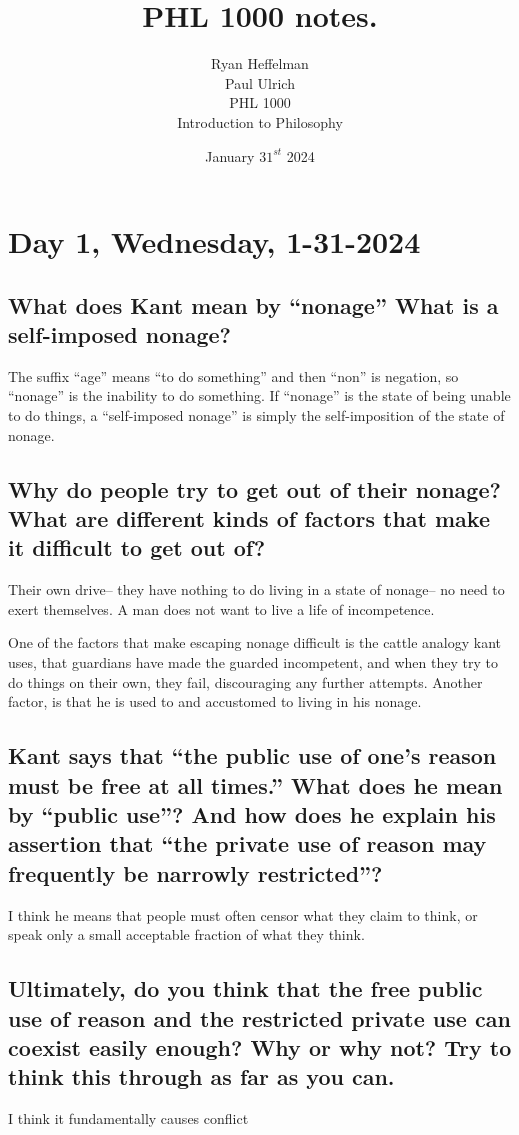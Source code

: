 \documentclass[12pt]{article}
\begin{document}
\date{January \(31^{st}\) 2024}
\title{PHL 1000 notes.}
\author{Ryan Heffelman\\Paul Ulrich \\
PHL 1000 \\Introduction to Philosophy} 
\maketitle

\section{Day 1, Wednesday, 1-31-2024}

\subsection{What does Kant mean by ``nonage'' What is a self-imposed nonage?}
The suffix ``age'' means ``to do something'' and then ``non'' is negation, so ``nonage'' is the inability to do something. If ``nonage'' is the state of being unable to do things, a ``self-imposed nonage'' is simply the self-imposition of the state of nonage.

\subsection{Why do people try to get out of their nonage? What are different kinds of factors that make it difficult to get out of?}
Their own drive-- they have nothing to do living in a state of nonage-- no need to exert themselves. A man does not want to live a life of incompetence. 

One of the factors that make escaping nonage difficult is the cattle analogy kant uses, that guardians have made the guarded incompetent, and when they try to do things on their own, they fail, discouraging any further attempts. Another factor, is that he is used to and accustomed to living in his nonage.



\subsection{Kant says that ``the public use of one's reason must be free at all times.'' What does he mean by ``public use''? And how does he explain his assertion that ``the private use of reason may frequently be narrowly restricted''?}

I think he means that people must often censor what they claim to think, or speak only a small acceptable fraction of what they think.

\subsection{Ultimately, do you think that the free public use of reason and the restricted private use can coexist easily enough? Why or why not? Try to think this through as far as you can.}

I think it fundamentally causes conflict
\end{document}
